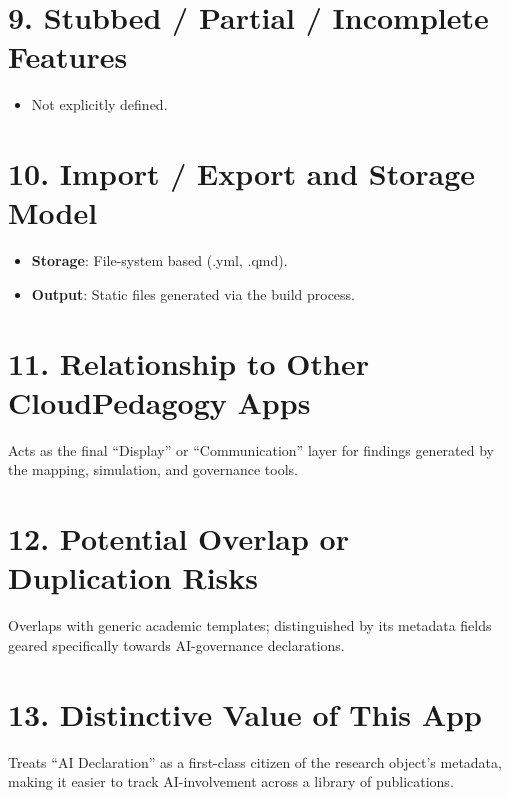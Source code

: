 \documentclass[
]{report}
\providecommand{\tightlist}{%
  \setlength{\itemsep}{0pt}\setlength{\parskip}{0pt}}
\begin{document}
\section{9. Stubbed / Partial / Incomplete
Features}\label{stubbed-partial-incomplete-features}

\begin{itemize}
\tightlist
\item
  Not explicitly defined.
\end{itemize}

\section{10. Import / Export and Storage
Model}\label{import-export-and-storage-model}

\begin{itemize}
\tightlist
\item
  \textbf{Storage}: File-system based (.yml, .qmd).
\item
  \textbf{Output}: Static files generated via the build process.
\end{itemize}

\section{11. Relationship to Other CloudPedagogy
Apps}\label{relationship-to-other-cloudpedagogy-apps}

Acts as the final ``Display'' or ``Communication'' layer for findings
generated by the mapping, simulation, and governance tools.

\section{12. Potential Overlap or Duplication
Risks}\label{potential-overlap-or-duplication-risks}

Overlaps with generic academic templates; distinguished by its metadata
fields geared specifically towards AI-governance declarations.

\section{13. Distinctive Value of This
App}\label{distinctive-value-of-this-app}

Treats ``AI Declaration'' as a first-class citizen of the research
object's metadata, making it easier to track AI-involvement across a
library of publications.
\end{document}
